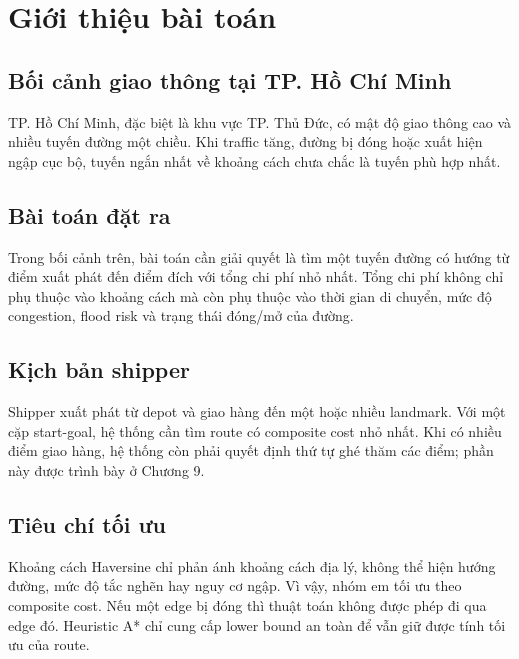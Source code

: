 \section{Giới thiệu bài toán}
\subsection{Bối cảnh giao thông tại TP. Hồ Chí Minh}
TP. Hồ Chí Minh, đặc biệt là khu vực TP. Thủ Đức, có mật độ giao thông cao và nhiều tuyến đường một chiều. Khi traffic tăng, đường bị đóng hoặc xuất hiện ngập cục bộ, tuyến ngắn nhất về khoảng cách chưa chắc là tuyến phù hợp nhất.

\subsection{Bài toán đặt ra}
Trong bối cảnh trên, bài toán cần giải quyết là tìm một tuyến đường có hướng từ điểm xuất phát đến điểm đích với tổng chi phí nhỏ nhất. Tổng chi phí không chỉ phụ thuộc vào khoảng cách mà còn phụ thuộc vào thời gian di chuyển, mức độ congestion, flood risk và trạng thái đóng/mở của đường.

\subsection{Kịch bản shipper}
Shipper xuất phát từ depot và giao hàng đến một hoặc nhiều landmark. Với một cặp start-goal, hệ thống cần tìm route có composite cost nhỏ nhất. Khi có nhiều điểm giao hàng, hệ thống còn phải quyết định thứ tự ghé thăm các điểm; phần này được trình bày ở Chương 9.

\subsection{Tiêu chí tối ưu}
Khoảng cách Haversine chỉ phản ánh khoảng cách địa lý, không thể hiện hướng đường, mức độ tắc nghẽn hay nguy cơ ngập. Vì vậy, nhóm em tối ưu theo composite cost. Nếu một edge bị đóng thì thuật toán không được phép đi qua edge đó. Heuristic A* chỉ cung cấp lower bound an toàn để vẫn giữ được tính tối ưu của route.
